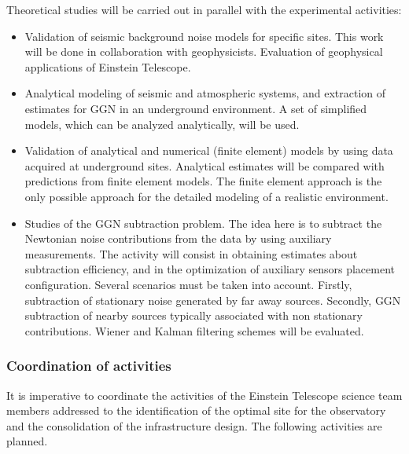 Theoretical studies will be carried out in parallel with the experimental activities:
\begin{itemize} 
\item{} Validation of seismic background noise models for specific sites. This work will be done in collaboration with geophysicists. Evaluation of geophysical applications of Einstein Telescope. 
\item{} Analytical modeling of seismic and atmospheric systems, and extraction of estimates for GGN in an underground environment. A set of simplified models, which can be analyzed analytically, will be used.
\item{} Validation of analytical and numerical (finite element) models by using data acquired at underground sites. Analytical estimates will be compared with predictions from finite element models. The finite element approach is the only possible approach for the detailed modeling of a realistic environment.
\item{} Studies of the GGN subtraction problem. The idea here is to subtract the Newtonian noise contributions from the data by using auxiliary measurements. The activity will consist in obtaining estimates about subtraction efficiency, and in the optimization of auxiliary sensors placement configuration. Several scenarios must be taken into account. Firstly, subtraction of stationary noise generated by far away sources. Secondly, GGN subtraction of nearby sources typically associated with non stationary contributions. Wiener and Kalman filtering schemes will be evaluated. 
\end{itemize}

\FloatBarrier
\subsubsection{Coordination of activities}
It is imperative to coordinate the activities of the Einstein Telescope science team members addressed to the identification of the optimal site for the observatory and the consolidation of the infrastructure design. The following activities are planned.

